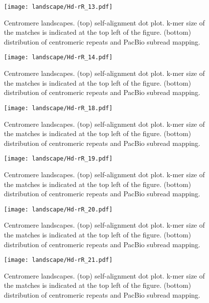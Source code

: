 \addtocounter{figure}{-1}
\begin{figure}[p]
  \centering
  \texttt{[image: landscape/Hd-rR\_13.pdf]}
  \caption{
    Centromere landscapes. (top) self-alignment dot plot. k-mer size of the matches is indicated at the top left of the figure. (bottom) distribution of centromeric repeats and PacBio subread mapping.
  }
  \label{centromere_landscape}
\end{figure}

\addtocounter{figure}{-1}
\begin{figure}[p]
  \centering
  \texttt{[image: landscape/Hd-rR\_14.pdf]}
  \caption{
    Centromere landscapes. (top) self-alignment dot plot. k-mer size of the matches is indicated at the top left of the figure. (bottom) distribution of centromeric repeats and PacBio subread mapping.
  }
  \label{centromere_landscape}
\end{figure}

\addtocounter{figure}{-1}
\begin{figure}[p]
  \centering
  \texttt{[image: landscape/Hd-rR\_18.pdf]}
  \caption{
    Centromere landscapes. (top) self-alignment dot plot. k-mer size of the matches is indicated at the top left of the figure. (bottom) distribution of centromeric repeats and PacBio subread mapping.
  }
  \label{centromere_landscape}
\end{figure}

\addtocounter{figure}{-1}
\begin{figure}[p]
  \centering
  \texttt{[image: landscape/Hd-rR\_19.pdf]}
  \caption{
    Centromere landscapes. (top) self-alignment dot plot. k-mer size of the matches is indicated at the top left of the figure. (bottom) distribution of centromeric repeats and PacBio subread mapping.
  }
  \label{centromere_landscape}
\end{figure}

\addtocounter{figure}{-1}
\begin{figure}[p]
  \centering
  \texttt{[image: landscape/Hd-rR\_20.pdf]}
  \caption{
    Centromere landscapes. (top) self-alignment dot plot. k-mer size of the matches is indicated at the top left of the figure. (bottom) distribution of centromeric repeats and PacBio subread mapping.
  }
  \label{centromere_landscape}
\end{figure}

\addtocounter{figure}{-1}
\begin{figure}[p]
  \centering
  \texttt{[image: landscape/Hd-rR\_21.pdf]}
  \caption{
    Centromere landscapes. (top) self-alignment dot plot. k-mer size of the matches is indicated at the top left of the figure. (bottom) distribution of centromeric repeats and PacBio subread mapping.
  }
  \label{centromere_landscape}
\end{figure}

